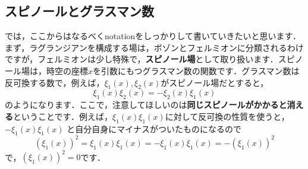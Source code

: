 \documentclass[a4paper,uplatex,dvipdfmx]{jsarticle}
\theoremstyle{definition}
\begin{document}
\subsection{スピノールとグラスマン数}

では，ここからはなるべくnotationをしっかりして書いていきたいと思います．まず，ラグランジアンを構成する場は，ボゾンとフェルミオンに分類されるわけですが，フェルミオンは少し特殊で，\textbf{スピノール場}として取り扱います．スピノール場は，時空の座標$x$を引数にもつグラスマン数の関数です．グラスマン数は反可換する数で，例えば，$\xi_1(x),\xi_2(x)$がスピノール場だとすると，
\begin{equation}
  \xi_{1}(x)\xi_{2}(x)
  =
  -\xi_{2}(x)\xi_{1}(x)
\end{equation}
のようになります．ここで，注意してほしいのは\textbf{同じスピノールがかかると消える}ということです．例えば，$\xi_{1}(x)
\xi_1(x)$に対して反可換の性質を使うと，$-\xi_1(x)\xi_1(x)$
と自分自身にマイナスがついたものになるので
\begin{equation}
  (\xi_1(x))^2
  =
  \xi_{1}(x)\xi_{1}(x)
  =
  -
  \xi_{1}(x)\xi_{1}(x)
  =
  -
  (\xi_1(x))^2
\end{equation}
で，$(\xi_1(x))^2=0$です．
\end{document}
